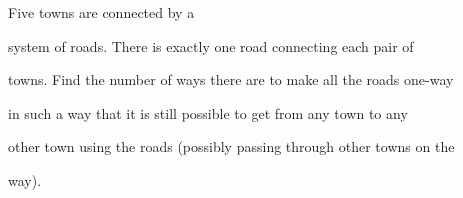 Five towns are connected by a 

system of roads. There is exactly one road connecting each pair of 

towns. Find the number of ways there are to make all the roads one-way 

in such a way that it is still possible to get from any town to any 

other town using the roads (possibly passing through other towns on the 

way).